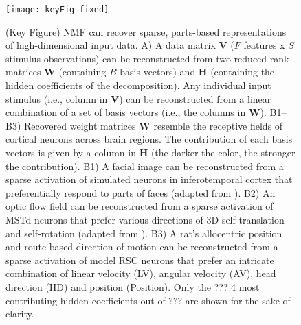 

\begin{figure}[h]
	\centering
	\texttt{[image: keyFig\_fixed]}
    \caption{(Key Figure) \ac{NMF} can recover sparse, parts-based
         representations of high-dimensional input data.
         A)  A data matrix \textbf{V} ($F$ features x $S$ stimulus
             observations) can be reconstructed from two reduced-rank
             matrices \textbf{W} (containing $B$ basis vectors) and 
             \textbf{H} (containing the hidden coefficients of the
             decomposition).
             Any individual input stimulus (i.e., column in \textbf{V})
             can be reconstructed from a linear combination of a set of
             basis vectors (i.e., the columns in \textbf{W}).
         B1--B3) Recovered weight matrices \textbf{W} resemble the
             receptive fields of cortical neurons across brain regions. The contribution of each basis vectors is given by a column 
             in \textbf{H} (the darker the color, the stronger the
             contribution).
         B1) A facial image can be reconstructed from a sparse activation
             of simulated neurons in inferotemporal cortex that
             preferentially respond to parts of faces
             (adapted from \cite{LeeSeung1999}).
         B2) An optic flow field can be reconstructed from a sparse
             activation of \ac{MSTd} neurons that prefer various
             directions of 3D self-translation and self-rotation
             (adapted from \cite{Beyeler2016}).
         B3) A rat's allocentric position and route-based direction of
             motion can be reconstructed from a sparse activation of
             model \ac{RSC} neurons that prefer an intricate combination of
             linear velocity (LV), angular velocity (AV), head direction (HD)
             and position (Position). Only the ??? 4 most contributing hidden coefficients out of ??? are shown for the
             sake of clarity.}
	\label{fig:NMF|reconstruction}
\end{figure}

